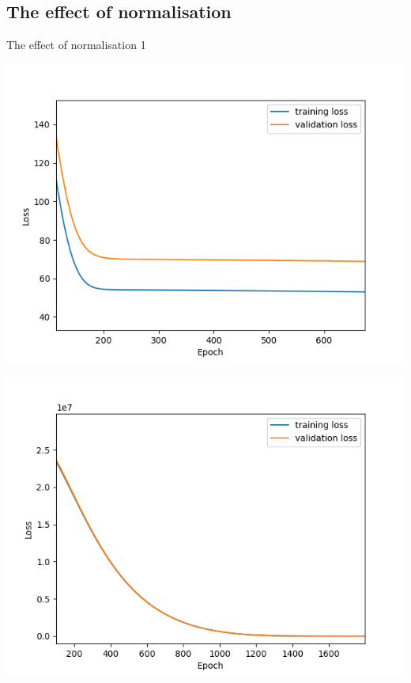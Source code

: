 \documentclass{beamer}
\begin{document}
\subsection{The effect of normalisation}
\begin{frame}{The effect of normalisation 1}
\centering
\begin{minipage}{0.48\textwidth}
	\includegraphics[width=\textwidth]{Figure_2.png}
	\label{historyNormalised}
\end{minipage}
\begin{minipage}{0.48\textwidth}
	\includegraphics[width=\textwidth]{History_subplot_1.png}
	\label{historyNonNormalised}
\end{minipage}

\end{frame}
\end{document}
